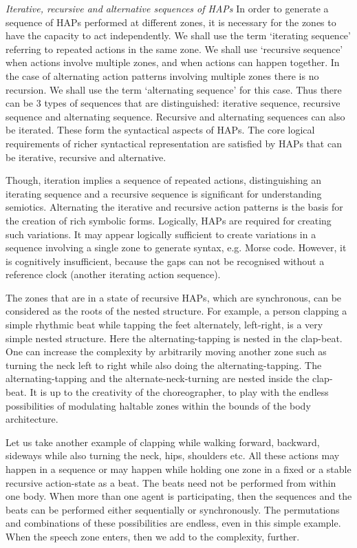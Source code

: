 \emph{Iterative, recursive and alternative sequences of HAPs} In order to generate a sequence of HAPs performed at different zones, it is necessary for the zones to have the capacity to act independently. We shall use the term `iterating sequence' referring to repeated actions in the same zone. We shall use `recursive sequence' when actions involve multiple zones, and when actions can happen together. In the case of alternating action patterns involving multiple zones there is no recursion. We shall use the term `alternating sequence' for this case. Thus there can be 3 types of sequences that are distinguished:  iterative sequence, recursive sequence and alternating sequence. Recursive and alternating sequences can also be iterated. These form the syntactical aspects of HAPs. The core logical requirements of richer syntactical representation are satisfied by HAPs that can be iterative, recursive and alternative. 

Though, iteration implies a sequence of repeated actions, distinguishing an iterating sequence and a recursive sequence is significant for understanding semiotics. Alternating the iterative and recursive action patterns is the basis for the creation of rich symbolic forms. Logically, HAPs are required for creating such variations. It may appear logically sufficient to create variations in a sequence involving a single zone to generate syntax, e.g. Morse code.  However, it is cognitively insufficient, because the gaps can not be recognised without a reference clock (another iterating action sequence). 

The zones that are in a state of recursive HAPs, which are synchronous, can be considered as the roots of the nested structure. For example, a person clapping a simple rhythmic beat while tapping the feet alternately, left-right, is a very simple nested structure. Here the alternating-tapping is nested in the clap-beat. One can increase the complexity by arbitrarily moving another zone such as turning the neck left to right while also doing the alternating-tapping. The alternating-tapping and the alternate-neck-turning are nested inside the clap-beat. It is up to the creativity of the choreographer, to play with the endless possibilities of modulating haltable zones within the bounds of the body architecture. 

Let us take another example of clapping while walking forward, backward, sideways while also turning the neck, hips, shoulders etc. All these actions may happen in a sequence or may happen while holding one zone in a fixed or a stable recursive action-state as a beat. The beats need not be performed from within one body. When more than one agent is participating, then the sequences and the beats can be performed either sequentially or synchronously. The permutations and combinations of these possibilities are endless, even in this simple example. When the speech zone enters, then we add to the complexity, further. 

